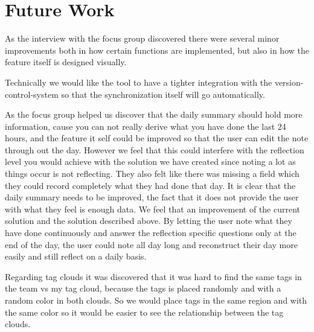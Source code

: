 \section{Future Work}
As the interview with the focus group discovered there were several minor improvements both in how certain functions are implemented, but also in how the feature itself is designed visually. 

Technically we would like the tool to have a tighter integration with the version-control-system so that the synchronization itself will go automatically.

As the focus group helped us discover that the daily summary should hold more information, cause you can not really derive what you have done the last 24 hours, and the feature it self could be improved so that the user can edit the note through out the day. However we feel that this could interfere with the reflection level you would achieve with the solution we have created since noting a lot as things occur is not reflecting. They also felt like there was missing a field which they could record completely what they had done that day. It is clear that the daily summary needs to be improved, the fact that it does not provide the user with what they feel is enough data. We feel that an improvement of the current solution and the solution described above. By letting the user note what they have done continuously and answer the reflection specific questions only at the end of the day, the user could note all day long and reconstruct their day more easily and still reflect on a daily basis.

Regarding tag clouds it was discovered that it was hard to find the same tags in the team vs my tag cloud, because the tags is placed randomly and with a random color in both clouds. So we would place tags in the same region and with the same color so it would be  easier to see the relationship between the tag clouds.

